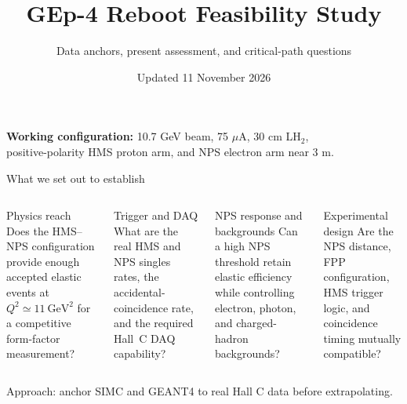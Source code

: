 \documentclass[aspectratio=169,10pt]{beamer}
\title{GEp-4 Reboot Feasibility Study}
\subtitle{Data anchors, present assessment, and critical-path questions}
\date{Updated 11 November 2026}
\newcommand{\qval}{\ensuremath{Q^2 \simeq 11~\mathrm{GeV}^2}}
\begin{document}
\begin{frame}[plain]
  \titlepage
  \vspace{-0.7cm}
  \begin{center}
    \colorbox{blue!5}{\parbox{0.91\textwidth}{\centering
      \textbf{Working configuration:} 10.7 GeV beam, 75 $\mu$A, 30 cm LH$_2$,\\
      positive-polarity HMS proton arm, and NPS electron arm near 3 m.}}
  \end{center}
\end{frame}

\begin{frame}{What we set out to establish}
  \begin{columns}[T,onlytextwidth]
      \begin{block}{Physics reach}
        Does the HMS--NPS configuration provide enough accepted elastic events
        at \qval{} for a competitive form-factor measurement?
      \end{block}
      \begin{block}{Trigger and DAQ}
        What are the real HMS and NPS singles rates, the accidental-coincidence
        rate, and the required Hall~C DAQ capability?
      \end{block}
      \begin{block}{NPS response and backgrounds}
        Can a high NPS threshold retain elastic efficiency while controlling
        electron, photon, and charged-hadron backgrounds?
      \end{block}
      \begin{block}{Experimental design}
        Are the NPS distance, FPP configuration, HMS trigger logic, and
        coincidence timing mutually compatible?
      \end{block}
  \end{columns}

  \vfill
  \begin{center}
    \alert{Approach: anchor SIMC and GEANT4 to real Hall C data before extrapolating.}
  \end{center}
\end{frame}
\end{document}
